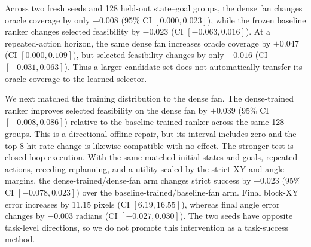 \documentclass{article}
\begin{document}
Across two fresh seeds and 128 held-out state--goal groups, the dense fan
changes oracle coverage by only $+0.008$ (95\% CI $[0.000,0.023]$), while the
frozen baseline ranker changes selected feasibility by $-0.023$ (CI
$[-0.063,0.016]$). At a repeated-action horizon, the same dense fan increases
oracle coverage by $+0.047$ (CI $[0.000,0.109]$), but selected feasibility
changes by only $+0.016$ (CI $[-0.031,0.063]$). Thus a larger candidate set
does not automatically transfer its oracle coverage to the learned selector.

We next matched the training distribution to the dense fan. The dense-trained
ranker improves selected feasibility on the dense fan by $+0.039$ (95\% CI
$[-0.008,0.086]$) relative to the baseline-trained ranker across the same
128 groups. This is a directional offline repair, but its interval includes
zero and the top-$8$ hit-rate change is likewise compatible with no effect.
The stronger test is closed-loop execution. With the same matched initial
states and goals, repeated actions, receding replanning, and a utility scaled
by the strict XY and angle margins, the dense-trained/dense-fan arm changes
strict success by $-0.023$ (95\% CI $[-0.078,0.023]$) over the
baseline-trained/baseline-fan arm. Final block-XY error increases by
$11.15$ pixels (CI $[6.19,16.55]$), whereas final angle error changes by
$-0.003$ radians (CI $[-0.027,0.030]$). The two seeds have opposite task-level
directions, so we do not promote this intervention as a task-success method.

\begin{table}[H]
\centering
\scriptsize
\setlength{\tabcolsep}{4pt}
\caption{Candidate-generation and matched-training audit. Paired deltas use
the same held-out state--goal groups; lower final errors are better. The
offline rows use 128 groups, and the closed-loop rows use 128 episodes over
two fresh seeds.}
\label{tab:supp-candidate-augmented-closure}
\end{table}
\end{document}
